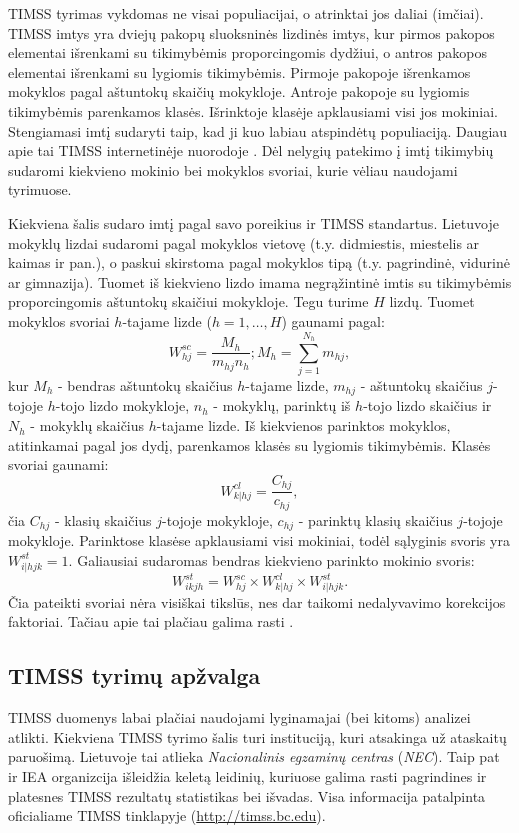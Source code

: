 \documentclass[11pt,a4paper]{article}
\begin{document}
\indent TIMSS tyrimas vykdomas ne visai populiacijai, o atrinktai jos daliai (imčiai). TIMSS imtys yra dviejų pakopų sluoksninės lizdinės imtys, kur pirmos pakopos elementai išrenkami su tikimybėmis proporcingomis dydžiui, o antros pakopos elementai išrenkami su lygiomis tikimybėmis. Pirmoje pakopoje išrenkamos mokyklos pagal aštuntokų skaičių mokykloje. Antroje pakopoje su lygiomis tikimybėmis parenkamos klasės. Išrinktoje klasėje apklausiami visi jos mokiniai. Stengiamasi imtį sudaryti taip, kad ji kuo labiau atspindėtų populiaciją. Daugiau apie tai TIMSS internetinėje nuorodoje \cite{2011Sample}. Dėl nelygių patekimo į imtį tikimybių sudaromi kiekvieno mokinio bei mokyklos svoriai, kurie vėliau naudojami tyrimuose.

\indent Kiekviena šalis sudaro imtį pagal savo poreikius ir TIMSS standartus. Lietuvoje mokyklų lizdai sudaromi pagal mokyklos vietovę (t.y. didmiestis, miestelis ar kaimas ir pan.), o paskui skirstoma pagal mokyklos tipą (t.y. pagrindinė, vidurinė ar gimnazija). Tuomet iš kiekvieno lizdo imama negrąžintinė imtis su tikimybėmis proporcingomis aštuntokų skaičiui mokykloje. Tegu turime $H$ lizdų. Tuomet mokyklos svoriai $h$-tajame lizde ($h=1,\dots,H$) gaunami pagal:
\begin{equation}
W^{sc}_{hj} = \frac{M_h}{m_{hj}n_h}; M_h=\sum^{N_h}_{j=1} m_{hj},
\end{equation}
kur $M_h$ - bendras aštuntokų skaičius $h$-tajame lizde, $m_{hj}$ - aštuntokų skaičius $j$-tojoje $h$-tojo lizdo mokykloje, $n_h$ - mokyklų, parinktų iš $h$-tojo lizdo skaičius ir $N_h$ - mokyklų skaičius $h$-tajame lizde. Iš kiekvienos parinktos mokyklos, atitinkamai pagal jos dydį, parenkamos klasės su lygiomis tikimybėmis. Klasės svoriai gaunami:
\begin{equation}
W^{cl}_{k|hj} = \frac{C_{hj}}{c_{hj}},
\end{equation}
čia $C_{hj}$ - klasių skaičius $j$-tojoje mokykloje, $c_{hj}$ - parinktų klasių skaičius $j$-tojoje mokykloje. Parinktose klasėse apklausiami visi mokiniai, todėl sąlyginis svoris yra $W^{st}_{i|hjk} = 1$. Galiausiai sudaromas bendras kiekvieno parinkto mokinio svoris:
\begin{equation}
W^{st}_{ikjh} = W^{sc}_{hj}\times W^{cl}_{k|hj}\times W^{st}_{i|hjk}.
\end{equation}
Čia pateikti svoriai nėra visiškai tikslūs, nes dar taikomi nedalyvavimo korekcijos faktoriai. Tačiau apie tai plačiau galima rasti \cite{2011Sample}.

\subsection{TIMSS tyrimų apžvalga}
TIMSS duomenys labai plačiai naudojami lyginamajai (bei kitoms) analizei atlikti. Kiekviena TIMSS tyrimo šalis turi instituciją, kuri atsakinga už ataskaitų paruošimą. Lietuvoje tai atlieka \textit{Nacionalinis egzaminų centras} (\textit{NEC}). Taip pat ir IEA organizcija išleidžia keletą leidinių, kuriuose galima rasti pagrindines ir platesnes TIMSS rezultatų statistikas bei išvadas. Visa informacija patalpinta oficialiame TIMSS tinklapyje (\url{http://timss.bc.edu}).
\end{document}
